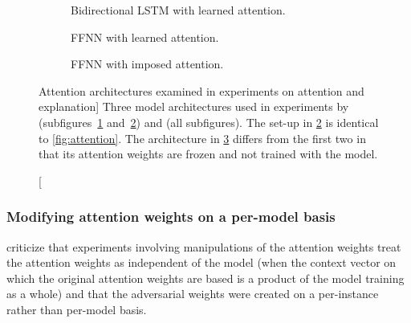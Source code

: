 \begin{figure}[tb]
\centering
\begin{subfigure}{.3\textwidth}
  \centering
  
  \caption{Bidirectional LSTM with learned attention.}
  \label{fig:attn-lstm}
\end{subfigure}\hfill%
\begin{subfigure}{.3\textwidth}
  \centering
  
  \caption{FFNN with learned attention.}
  \label{fig:attn-ffnn}
\end{subfigure}\hspace{4mm}%
\begin{subfigure}{.3\textwidth}
  \centering
  
  \caption{FFNN with imposed attention.}
  \label{fig:attn-imposed}
\end{subfigure}
\caption
[Attention architectures examined in experiments on attention and explanation]
{Three model architectures used in experiments by \citet{jain2019attentionNotExplanation} (subfigures~\ref{fig:attn-lstm} and~\ref{fig:attn-ffnn}) and \citet{wiegreffe2019attentionNotNot} (all subfigures).
The set-up in \ref{fig:attn-ffnn} is identical to \autoref{fig:attention}.
The architecture in \ref{fig:attn-imposed} differs from the first two in that its attention weights are frozen and not trained with the model.
}
\label{fig:attention-experiments}
\end{figure}


\subsubsection{Modifying attention weights on a per-model basis}

\citet{wiegreffe2019attentionNotNot} criticize that experiments involving manipulations of the attention weights treat the attention weights as independent of the model (when the context vector on which the original attention weights are based is a product of the model training as a whole) and that the adversarial weights were created on a per-instance rather than per-model basis.


